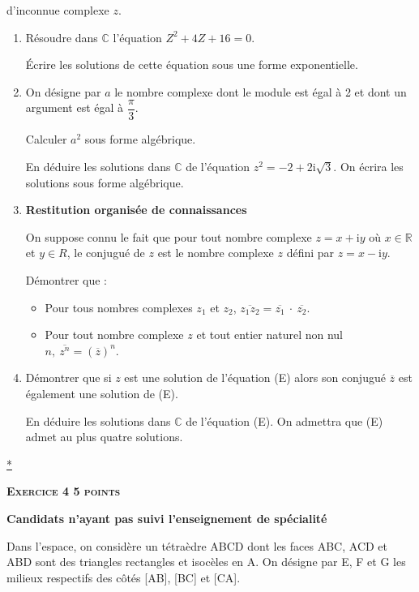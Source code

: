 \documentclass[10pt]{article}
\newcommand{\R}{\mathbb{R}}
\newcommand{\C}{\mathbb{C}}
\begin{document}
 d'inconnue complexe $z$. 

\begin{enumerate}
\item Résoudre dans $\C$ l'équation $Z^2 +4Z + 16 = 0$. 

Écrire les solutions de cette équation sous une forme exponentielle. 
\item On désigne par $a$ le nombre complexe dont le module est égal à 2 et dont un argument est égal à $\dfrac{\pi}{3}$. 

Calculer $a^2$ sous forme algébrique. 

En déduire les solutions dans $\C$ de l'équation $z^2 = - 2 + 2\text{i}\sqrt{3}$. On écrira les solutions sous forme algébrique. 
\item \textbf{Restitution organisée de connaissances} 

On suppose connu le fait que pour tout nombre complexe $z = x + \text{i}y$ où $x \in \R$ et $y \in R$, le conjugué de $z$ est le nombre complexe $z$ défini par $z = x - \text{i} y$. 

Démontrer que : 

\begin{itemize}
\item Pour tous nombres complexes $z_{1}$ et $z_{2}$,\: $\overline{z_{1}z_{2}} = \overline{z_{1}}\:\cdot\:\overline{z_{2}}$. 
\item Pour tout nombre complexe $z$ et tout entier naturel non nul $n,\: \overline{z^{n}} = \left(\overline{z}\right)^n$.
\end{itemize} 
\item Démontrer que si $z$ est une solution de l'équation (E) alors son conjugué $\overline{z}$ est également une solution de (E). 

En déduire les solutions dans $\C$ de l'équation (E). On admettra que (E) admet au plus quatre solutions. 
\end{enumerate}

\hyperlink{Index}{*}
\vspace{0,5cm}

\textbf{\textsc{Exercice 4 \hfill 5 points}}

\textbf{Candidats n'ayant pas suivi l'enseignement de spécialité} 

\medskip

Dans l'espace, on considère un tétraèdre ABCD dont les faces ABC, ACD et ABD sont des 
triangles rectangles et isocèles en A. On désigne par E, F et G les milieux respectifs des côtés [AB], [BC] et [CA].  
\end{document}
